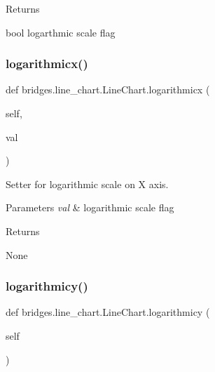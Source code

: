 \begin{DoxyReturn}{Returns}


bool logarthmic scale flag 
\end{DoxyReturn}
\mbox{\label{classbridges_1_1line__chart_1_1_line_chart_a6feef7582874fb2338ff7fa7a469db5d}} 
\subsubsection{\texorpdfstring{logarithmicx()}{logarithmicx()}\hspace{0.1cm}{\footnotesize\ttfamily [2/2]}}
{\footnotesize\ttfamily def bridges.\+line\+\_\+chart.\+Line\+Chart.\+logarithmicx (\begin{DoxyParamCaption}\item[{}]{self,  }\item[{}]{val }\end{DoxyParamCaption})}



Setter for logarithmic scale on X axis. 


\begin{DoxyParams}{Parameters}
{\em val} & logarithmic scale flag \\
\hline
\end{DoxyParams}
\begin{DoxyReturn}{Returns}


None 
\end{DoxyReturn}
\mbox{\label{classbridges_1_1line__chart_1_1_line_chart_a7ddc26feab771e7b36e9040ee38fab7f}} 
\subsubsection{\texorpdfstring{logarithmicy()}{logarithmicy()}\hspace{0.1cm}{\footnotesize\ttfamily [1/2]}}
{\footnotesize\ttfamily def bridges.\+line\+\_\+chart.\+Line\+Chart.\+logarithmicy (\begin{DoxyParamCaption}\item[{}]{self }\end{DoxyParamCaption})}



